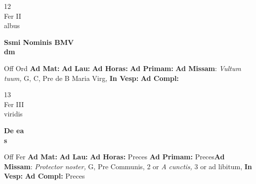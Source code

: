 \documentclass[10pt, openany]{book}
\begin{document}
        \begin{center}
            \begin{minipage}{3.5in}
                \vspace{2em}
                \begin{minipage}{0.5in}
                    {\Huge 12} \\
                    {\normalsize Fer II} \\
                    {\normalsize albus}
                \end{minipage}
                \begin{minipage}{3.0in}
                    \textbf{ \large Ssmi Nominis BMV \\
                    \textnormal{\normalsize dm}} \\ 
                \end{minipage}
                \begin{justify}Off Ord
                    \textbf{Ad Mat: }
                    \textbf{Ad Lau: }
                    \textbf{Ad Horas: }
                    \textbf{Ad Primam: }\textbf{Ad Missam}: \textit{Vultum tuum,} G, C, Pre de B Maria Virg,  
                    \textbf{In Vesp: }
                    \textbf{Ad Compl: }
                \end{justify}
            \end{minipage}
        \end{center}
    
        \begin{center}
            \begin{minipage}{3.5in}
                \vspace{2em}
                \begin{minipage}{0.5in}
                    {\Huge 13} \\
                    {\normalsize Fer III} \\
                    {\normalsize viridis}
                \end{minipage}
                \begin{minipage}{3.0in}
                    \textbf{ \large De ea \\
                    \textnormal{\normalsize s}} \\ 
                \end{minipage}
                \begin{justify}Off Fer
                    \textbf{Ad Mat: }
                    \textbf{Ad Lau: }
                    \textbf{Ad Horas: }Preces
                    \textbf{Ad Primam: }Preces\textbf{Ad Missam}: \textit{Protector noster,} G, Pre Communis, 2 or \textit{A cunctis,} 3 or ad libitum,  
                    \textbf{In Vesp: }
                    \textbf{Ad Compl: }Preces
                \end{justify}
            \end{minipage}
        \end{center}
    
\end{document}
